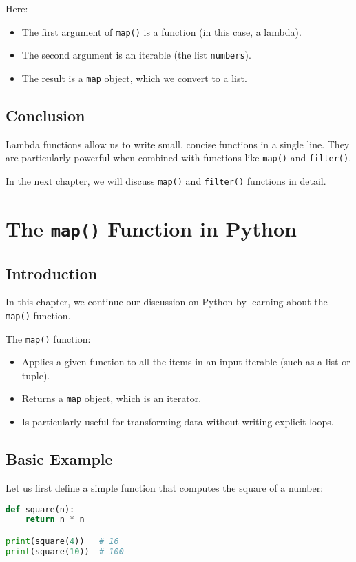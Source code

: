Here:
\begin{itemize}
    \item The first argument of \texttt{map()} is a function (in this case, a lambda).
    \item The second argument is an iterable (the list \texttt{numbers}).
    \item The result is a \texttt{map} object, which we convert to a list.
\end{itemize}

\section{Conclusion}
Lambda functions allow us to write small, concise functions in a single line.  
They are particularly powerful when combined with functions like \texttt{map()} and \texttt{filter()}.  

In the next chapter, we will discuss \texttt{map()} and \texttt{filter()} functions in detail.


\chapter{The \texttt{map()} Function in Python}

\section{Introduction}
In this chapter, we continue our discussion on Python by learning about the \texttt{map()} function.  

The \texttt{map()} function:
\begin{itemize}
    \item Applies a given function to all the items in an input iterable (such as a list or tuple).
    \item Returns a \texttt{map} object, which is an iterator.
    \item Is particularly useful for transforming data without writing explicit loops.
\end{itemize}

\section{Basic Example}
Let us first define a simple function that computes the square of a number:
\begin{lstlisting}[language=Python, caption={Square function}]
def square(n):
    return n * n

print(square(4))   # 16
print(square(10))  # 100
\end{lstlisting}

